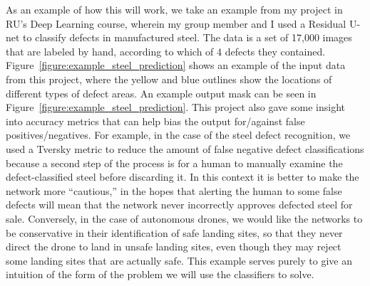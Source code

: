As an example of how this will work, we take an example from my project in RU's Deep Learning
course, wherein my group member and I used a Residual U-net to classify defects
in manufactured steel.
The data is a set of 17,000 images that are labeled by hand, according to which of 4 defects they contained.
Figure~\ref{figure:example_steel_prediction} shows an example of the input data from this project,
where the yellow and blue outlines show the locations of different types of defect areas.
An example output mask can be seen in Figure~\ref{figure:example_steel_prediction}.
This project also gave some insight into accuracy metrics that can help bias the output
for/against false positives/negatives.
For example, in the case of the steel defect recognition, we used a Tversky metric to
reduce the amount of false negative defect classifications because a second step of the
process is for a human to manually examine the defect-classified steel before discarding it.
In this context it is better to make the network more ``cautious,'' in the hopes that
alerting the human to some false defects will mean that the network never incorrectly approves
defected steel for sale.
Conversely, in the case of autonomous drones,
we would like the networks to be conservative in their identification of safe landing sites,
so that they never direct the drone to land in unsafe landing sites, even though they may reject
some landing sites that are actually safe.
This example serves purely to give an intuition of the form of the problem we will use the classifiers to solve.

